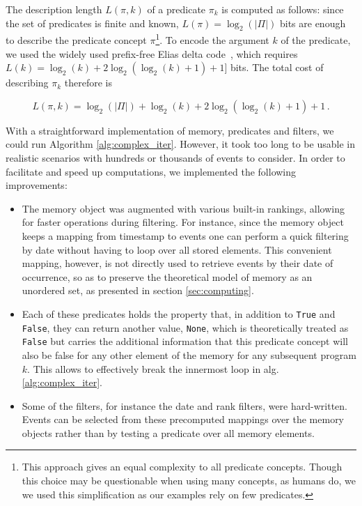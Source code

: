 \documentclass[entropy,article,submit,moreauthors,pdftex]{Definitions/mdpi}
\begin{document}
The description length $L(\pi, k)$ of a predicate $\pi_k$ is computed as follows: since the set of predicates is finite and known, $L(\pi) = \log_2(|\Pi|)$ bits are enough to describe the predicate concept $\pi$\footnote{This approach gives an equal complexity to all predicate concepts. Though this choice may be questionable when using many concepts, as humans do, we we used this simplification as our examples rely on few predicates.}. To encode the argument $k$ of the predicate, we used the widely used prefix-free Elias delta code~\cite{elias_universal_1975}, which requires $L(k) = \log_2(k) + 2 \log_2(\log_2(k)+1) + 1]$ bits. The total cost of describing $\pi_{k}$ therefore is

\begin{equation}
    \label{eq:pred_cost}
    L(\pi, k) = \log_2(|\Pi|) + \log_2(k) + 2 \log_2(\log_2(k) + 1) + 1\,.
\end{equation}

With a straightforward implementation of memory, predicates and filters, we could run Algorithm \ref{alg:complex_iter}. However, it took too
long to be usable in realistic scenarios with hundreds or thousands of events to
consider. In order to facilitate and speed up computations, we implemented
the following improvements:
\begin{itemize}
    \item The memory object was augmented with various built-in rankings, allowing
          for faster operations during filtering. For instance, since the memory
          object keeps a mapping from timestamp to events one can perform a quick
          filtering by date without having to loop over all stored elements. This convenient mapping,
          however, is not directly used to retrieve events by their date of occurrence, so as to
          preserve the theoretical model of memory as an unordered set, as presented in
          section \ref{sec:computing}.

    \item Each of these predicates holds the property that, in addition to
          \texttt{True} and \texttt{False}, they can return another value,
          \texttt{None}, which is theoretically treated as \texttt{False} but carries
          the additional information that this predicate concept will also be false for
          any other element of the memory for any subsequent program $k$. This allows to
          effectively break the innermost loop in alg. \ref{alg:complex_iter}.

    \item Some of the filters, for instance the date and rank filters, were
          hard-written. Events can be selected from these precomputed mappings over the memory objects
          rather than by testing a predicate over all memory elements.
\end{itemize}
\end{document}
